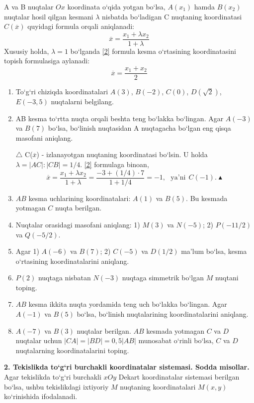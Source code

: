 A va B nuqtalar $Ox$ koordinata o`qida yotgan bo`lsa, $A(x_{1})$ hamda $B(x_{2})$ nuqtalar hosil qilgan kesmani $\lambda$ nisbatda bo`ladigan C nuqtaning koordinatasi $C(\overline{x})$ quyidagi formula orqali aniqlanadi:
\begin{equation}
	\overline{x}=\frac{x_{1}+\lambda x_{2}}{1+\lambda}
	\label{2}
\end{equation}
Xususiy holda, $\lambda=1$ bo`lganda \eqref{2} formula kesma o`rtasining koordinatasini topish formulasiga aylanadi:
\begin{equation}
	\overline{x}=\frac{x_{1}+x_{2}}{2}
	\label{3}
\end{equation}
\begin{enumerate}
	\item To`g`ri chiziqda koordinatalari $A(3)$, $B(-2)$, $C(0)$, $D(\sqrt{2})$, $E(-3,5)$ nuqtalarni belgilang.
	\item AB kesma to`rtta nuqta orqali beshta teng bo`lakka bo`lingan. Agar $A(-3)$ va $B(7)$ bo`lsa, bo`linish nuqtasidan A  nuqtagacha bo`lgan eng qisqa masofani aniqlang.
	
	$\triangle$
	C($\overline{x}$) - izlanayotgan nuqtaning koordinatasi bo`lsin. U holda $\lambda=|AC|:|CB|=1/4$. \eqref{2} formulaga binoan,
	$$\overline{x}=\frac{x_{1}+\lambda x_{2}}{1+\lambda}=\frac{-3+(1/4)\cdot 7}{1+1/4}=-1,\ \ \ \textrm{ya'ni}\ \  C(-1).\blacktriangle$$
	\item $AB$ kesma uchlarining koordinatalari: $A(1)$ va $B(5)$. Bu kesmada yotmagan $C$ nuqta berilgan. 
	\item Nuqtalar orasidagi masofani aniqlang: 1) $M(3)$ va $N(-5)$; 2) $P(-11/2)$ va $Q(-5/2)$.
	\item Agar 1) $A(-6)$ va $B(7)$; 2) $C(-5)$ va $D(1/2)$ ma'lum bo`lsa, kesma o`rtasining koordinatalarini aniqlang.
	\item $P(2)$ nuqtaga nisbatan $N(-3)$ nuqtaga simmetrik bo`lgan $M$ nuqtani toping.
	\item $AB$ kesma ikkita nuqta yordamida teng uch bo`lakka bo`lingan. Agar $A(-1)$ va $B(5)$ bo`lsa, bo`linish nuqtalarining koordinatalarini aniqlang.
	\item $A(-7)$ va $B(3)$ nuqtalar berilgan. $AB$ kesmada yotmagan $C$ va $D$ nuqtalar uchun $|CA|=|BD|=0,5|AB|$ munosabat o`rinli bo`lsa, $C$ va $D$ nuqtalarning koordinatalarini toping.
\end{enumerate}

\textbf{2. Tekislikda to`g`ri burchakli koordinatalar sistemasi. Sodda misollar.}
Agar tekislikda to`g`ri burchakli $xOy$ Dekart koordinatalar sistemasi berilgan bo`lsa, ushbu tekislikdagi ixtiyoriy $M$ nuqtaning koordinatalari $M(x,y)$ ko`rinishida ifodalanadi.

